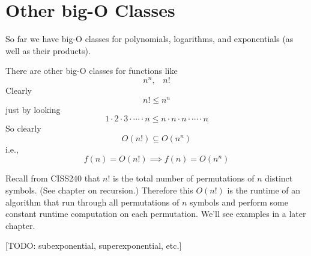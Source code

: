 \section{Other big-O Classes}

So far we have big-O classes for polynomials, logarithms, and 
exponentials (as well as their products).

There are other big-O classes for functions like
\[
n^n, \,\,\,\,\, n!
\]
Clearly
\[
n! \leq n^n
\]
just by looking
\[
1 \cdot 2 \cdot 3 \cdot \cdots \cdot n
\leq
n \cdot n \cdot n \cdot \cdots \cdot n
\]
So clearly
\[
O(n!) \subseteq O(n^n)
\]
i.e.,
\[
f(n) = O(n!) \implies f(n) = O(n^n)
\]

Recall from CISS240 that $n!$ is the total number of
permutations of $n$ distinct symbols.
(See chapter on recursion.)
Therefore this $O(n!)$ is the runtime of an algorithm
that run through all permutations of $n$ symbols
and perform some constant runtime computation on each permutation.
We'll see examples in a later chapter.



[TODO: subexponential, superexponential, etc.]
